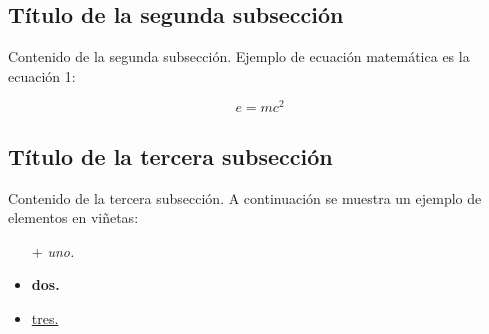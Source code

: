 \subsection{Título de la segunda subsección}
Contenido de la segunda subsección. Ejemplo de ecuación matemática es la ecuación 1:

\begin{equation}
    e=mc^2
    \label{ecuacion}
\end{equation}

\subsection{Título de la tercera subsección}
Contenido de la tercera subsección. A continuación se muestra un ejemplo de elementos en viñetas:

\begin{itemize} %
    \item [+]\textit{uno.}
    \item \textbf{dos.}
    \item \underline{tres.}
\end{itemize}


